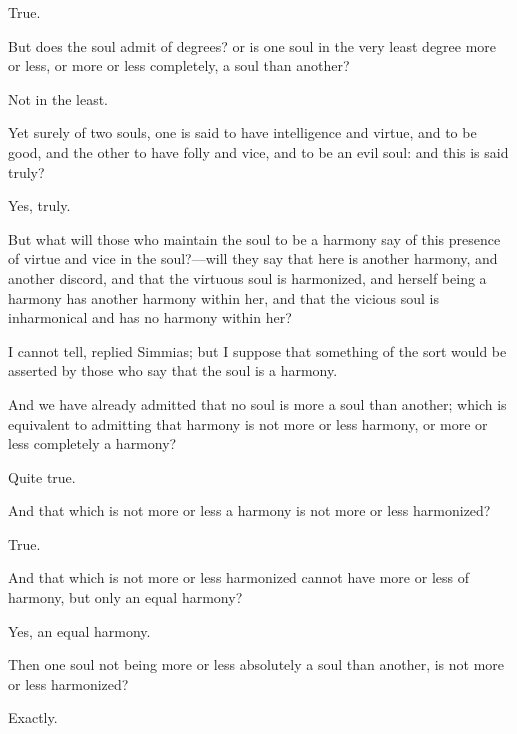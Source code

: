 \documentclass[11pt,letter]{article}
\begin{document}
\par  True.

\par  But does the soul admit of degrees? or is one soul in the very least degree more or less, or more or less completely, a soul than another?

\par  Not in the least.

\par  Yet surely of two souls, one is said to have intelligence and virtue, and to be good, and the other to have folly and vice, and to be an evil soul: and this is said truly?

\par  Yes, truly.

\par  But what will those who maintain the soul to be a harmony say of this presence of virtue and vice in the soul?—will they say that here is another harmony, and another discord, and that the virtuous soul is harmonized, and herself being a harmony has another harmony within her, and that the vicious soul is inharmonical and has no harmony within her?

\par  I cannot tell, replied Simmias; but I suppose that something of the sort would be asserted by those who say that the soul is a harmony.

\par  And we have already admitted that no soul is more a soul than another; which is equivalent to admitting that harmony is not more or less harmony, or more or less completely a harmony?

\par  Quite true.

\par  And that which is not more or less a harmony is not more or less harmonized?

\par  True.

\par  And that which is not more or less harmonized cannot have more or less of harmony, but only an equal harmony?

\par  Yes, an equal harmony.

\par  Then one soul not being more or less absolutely a soul than another, is not more or less harmonized?

\par  Exactly.
\end{document}
